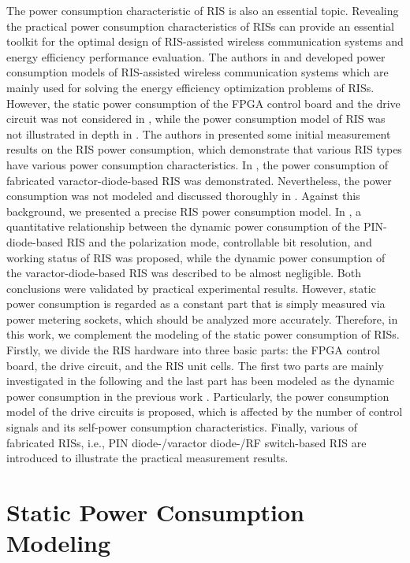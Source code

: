 \documentclass[journal]{IEEEtran}
\begin{document}
The power consumption characteristic of RIS is also an essential topic. Revealing the practical power consumption characteristics of RISs can provide an essential toolkit for the optimal design of RIS-assisted wireless communication systems and energy efficiency performance evaluation. The authors in \cite{huang2019reconfigurable} and \cite{zappone2020overhead} developed power consumption models of RIS-assisted wireless communication systems which are mainly used for solving the energy efficiency optimization problems of RISs. However, the static power consumption of the FPGA control board and the drive circuit was not considered in \cite{huang2019reconfigurable}, while the power consumption model of RIS was not illustrated in depth in \cite{zappone2020overhead}.
The authors in \cite{tang2020wireless} presented some initial measurement results on the RIS power consumption, which demonstrate that various RIS types have various power consumption characteristics. In \cite{9551980}, the power consumption of fabricated varactor-diode-based RIS was demonstrated. Nevertheless, the power consumption was not modeled and discussed thoroughly in \cite{tang2020wireless,9551980}. Against this background, we presented a precise RIS power consumption model. In \cite{wang2022reconfigurable}, a quantitative relationship between the dynamic power consumption of the PIN-diode-based RIS and the polarization mode, controllable bit resolution, and working status of RIS was proposed, while the dynamic power consumption of the varactor-diode-based RIS was described to be almost negligible. Both conclusions were validated by practical experimental results. However, static power consumption is regarded as a constant part that is simply measured via power metering sockets, which should be analyzed more accurately. Therefore, in this work, we complement the modeling of the static power consumption of RISs. Firstly, we divide the RIS hardware into three basic parts: the FPGA control board, the drive circuit, and the RIS unit cells. The first two parts are mainly investigated in the following and the last part has been modeled as the dynamic power consumption in the previous work \cite{wang2022reconfigurable}. Particularly, the power consumption model of the drive circuits is proposed, which is affected by the number of control signals and its self-power consumption characteristics. Finally, various of fabricated RISs, i.e., PIN diode-/varactor diode-/RF switch-based RIS are introduced to illustrate the practical measurement results.

\section{Static Power Consumption Modeling}
\end{document}
